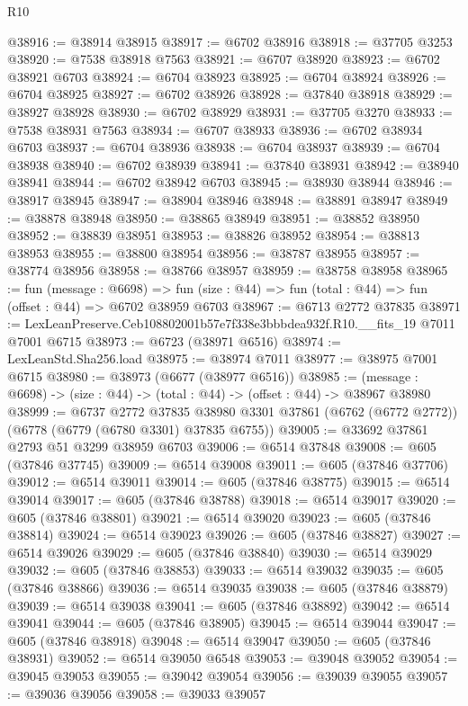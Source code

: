 \begin{lexlean}{R10}
\begin{coremodule}
@38916 := @38914 @38915
@38917 := @6702 @38916
@38918 := @37705 @3253
@38920 := @7538 @38918 @7563
@38921 := @6707 @38920
@38923 := @6702 @38921 @6703
@38924 := @6704 @38923
@38925 := @6704 @38924
@38926 := @6704 @38925
@38927 := @6702 @38926
@38928 := @37840 @38918
@38929 := @38927 @38928
@38930 := @6702 @38929
@38931 := @37705 @3270
@38933 := @7538 @38931 @7563
@38934 := @6707 @38933
@38936 := @6702 @38934 @6703
@38937 := @6704 @38936
@38938 := @6704 @38937
@38939 := @6704 @38938
@38940 := @6702 @38939
@38941 := @37840 @38931
@38942 := @38940 @38941
@38944 := @6702 @38942 @6703
@38945 := @38930 @38944
@38946 := @38917 @38945
@38947 := @38904 @38946
@38948 := @38891 @38947
@38949 := @38878 @38948
@38950 := @38865 @38949
@38951 := @38852 @38950
@38952 := @38839 @38951
@38953 := @38826 @38952
@38954 := @38813 @38953
@38955 := @38800 @38954
@38956 := @38787 @38955
@38957 := @38774 @38956
@38958 := @38766 @38957
@38959 := @38758 @38958
@38965 := fun (message : @6698) =>
  fun (size : @44) => fun (total : @44) => fun (offset : @44) => @6702 @38959 @6703
@38967 := @6713 @2772 @37835
@38971 := LexLeanPreserve.Ceb108802001b57e7f338e3bbbdea932f.R10.__fits_19 @7011 @7001 @6715
@38973 := @6723 (@38971 @6516)
@38974 := LexLeanStd.Sha256.load
@38975 := @38974 @7011
@38977 := @38975 @7001 @6715
@38980 := @38973 (@6677 (@38977 @6516))
@38985 := (message : @6698) -> (size : @44) -> (total : @44) -> (offset : @44) -> @38967 @38980
@38999 := @6737
    @2772
    @37835
    @38980
    @3301
    @37861
    (@6762 (@6772 @2772))
    (@6778 (@6779 (@6780 @3301) @37835 @6755))
@39005 := @33692 @37861 @2793 @51 @3299 @38959 @6703
@39006 := @6514 @37848
@39008 := @605 (@37846 @37745)
@39009 := @6514 @39008
@39011 := @605 (@37846 @37706)
@39012 := @6514 @39011
@39014 := @605 (@37846 @38775)
@39015 := @6514 @39014
@39017 := @605 (@37846 @38788)
@39018 := @6514 @39017
@39020 := @605 (@37846 @38801)
@39021 := @6514 @39020
@39023 := @605 (@37846 @38814)
@39024 := @6514 @39023
@39026 := @605 (@37846 @38827)
@39027 := @6514 @39026
@39029 := @605 (@37846 @38840)
@39030 := @6514 @39029
@39032 := @605 (@37846 @38853)
@39033 := @6514 @39032
@39035 := @605 (@37846 @38866)
@39036 := @6514 @39035
@39038 := @605 (@37846 @38879)
@39039 := @6514 @39038
@39041 := @605 (@37846 @38892)
@39042 := @6514 @39041
@39044 := @605 (@37846 @38905)
@39045 := @6514 @39044
@39047 := @605 (@37846 @38918)
@39048 := @6514 @39047
@39050 := @605 (@37846 @38931)
@39052 := @6514 @39050 @6548
@39053 := @39048 @39052
@39054 := @39045 @39053
@39055 := @39042 @39054
@39056 := @39039 @39055
@39057 := @39036 @39056
@39058 := @39033 @39057

\end{coremodule}
\end{lexlean}
